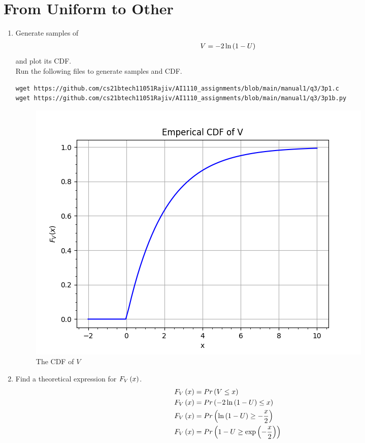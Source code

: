 \documentclass[journal,12pt,twocolumn]{IEEEtran}
\renewcommand\thesection{\arabic{section}}
\begin{document}
\section{From Uniform to Other}
\begin{enumerate}[label=\thesection.\arabic*
,ref=\thesection.\theenumi]
%
\item
Generate samples of 
%
\begin{align}
V = -2\ln\left(1-U\right)
\end{align}
%
and plot its CDF.  
\\
\solution Run the following files to generate samples and CDF.
\begin{lstlisting}
wget https://github.com/cs21btech11051Rajiv/AI1110_assignments/blob/main/manual1/q3/3p1.c
wget https://github.com/cs21btech11051Rajiv/AI1110_assignments/blob/main/manual1/q3/3p1b.py
\end{lstlisting}
\begin{figure}[ht!]
\centering
\includegraphics[width=\columnwidth]{./figs/fig3.1.png}
\caption{The CDF of $V$}
\label{fig:misc_cdf}
\end{figure}
\item Find a theoretical expression for $F_V\left(x\right)$.
\\
\solution 
\begin{align}
	F_V\brak{x} &= Pr\brak{V\le x} \\
	F_V\brak{x} &= Pr\brak{-2\ln{\brak{1-U}} \le x}	\\
	F_V\brak{x} &= Pr\brak{\ln{\brak{1-U}} \ge -\frac{x}{2}}	\\
	F_V\brak{x} &= Pr\brak{1-U \ge \exp{\brak{-\frac{x}{2}} }}	\\

\end{align}
\end{enumerate}
\end{document}
